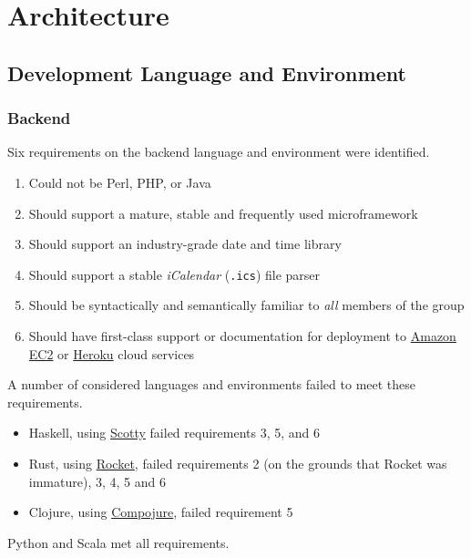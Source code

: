 \documentclass[11pt,a4paper]{report}
\begin{document}
\chapter{Architecture}

\section{Development Language and Environment}

\subsection{Backend}

Six requirements on the backend language and environment were identified.

\begin{enumerate}
    \item Could not be Perl, PHP, or Java
    \item Should support a mature, stable and frequently used microframework
    \item Should support an industry-grade date and time library
    \item Should support a stable \textit{iCalendar} (\texttt{.ics}) file parser
    \item Should be syntactically and semantically familiar to \textit{all} members of the group
    \item Should have first-class support or documentation for deployment to \href{http://docs.aws.amazon.com/AWSEC2/latest/UserGuide/concepts.html}{Amazon EC2} or \href{https://www.heroku.com/}{Heroku} cloud services
 \end{enumerate}

A number of considered languages and environments failed to meet these requirements.

\begin{itemize}
    \item Haskell, using \href{https://github.com/scotty-web/scotty}{Scotty} failed requirements 3, 5, and 6
    \item Rust, using \href{https://rocket.rs/overview/}{Rocket}, failed requirements 2 (on the grounds that Rocket was immature), 3, 4, 5 and 6
    \item Clojure, using \href{https://github.com/weavejester/compojure}{Compojure}, failed requirement 5
\end{itemize}

Python and Scala met all requirements. 
\end{document}
